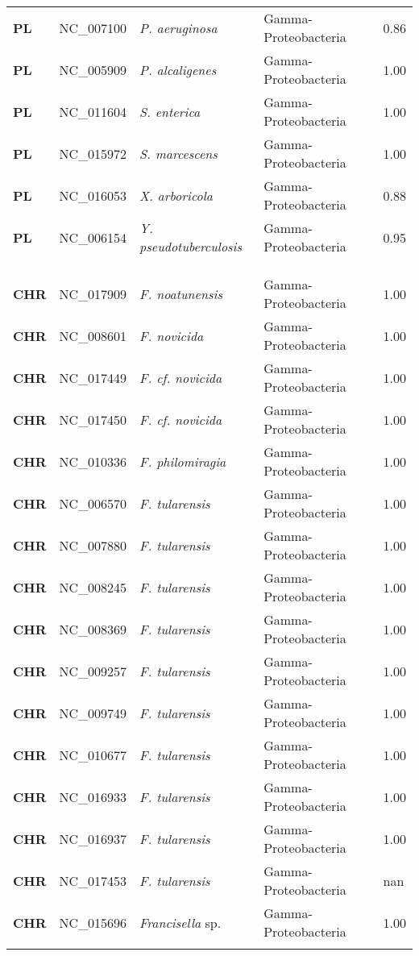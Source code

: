 \begin{adjustwidth}{-3cm}{2cm}
{\begin{supertabular}{>{\bfseries}l|p{0.1\textwidth}p{0.14\textwidth}l|l}
PL & NC\_007100 & \textit{P. aeruginosa} & Gamma-Proteobacteria & 0.86\\
PL & NC\_005909 & \textit{P. alcaligenes} & Gamma-Proteobacteria & 1.00\\
PL & NC\_011604 & \textit{S. enterica} & Gamma-Proteobacteria & 1.00\\
PL & NC\_015972 & \textit{S. marcescens} & Gamma-Proteobacteria & 1.00\\
PL & NC\_016053 & \textit{X. arboricola} & Gamma-Proteobacteria & 0.88\\
PL & NC\_006154 & \textit{Y. pseudotuberculosis} & Gamma-Proteobacteria & 0.95\\
\\
\\
\hline\\
CHR & NC\_017909 & \textit{F. noatunensis} & Gamma-Proteobacteria & 1.00\\
CHR & NC\_008601 & \textit{F. novicida} & Gamma-Proteobacteria & 1.00\\
CHR & NC\_017449 & \textit{F. cf. novicida} & Gamma-Proteobacteria & 1.00\\
CHR & NC\_017450 & \textit{F. cf. novicida} & Gamma-Proteobacteria & 1.00\\
CHR & NC\_010336 & \textit{F. philomiragia} & Gamma-Proteobacteria & 1.00\\
CHR & NC\_006570 & \textit{F. tularensis} & Gamma-Proteobacteria & 1.00\\
CHR & NC\_007880 & \textit{F. tularensis} & Gamma-Proteobacteria & 1.00\\
CHR & NC\_008245 & \textit{F. tularensis} & Gamma-Proteobacteria & 1.00\\
CHR & NC\_008369 & \textit{F. tularensis} & Gamma-Proteobacteria & 1.00\\
CHR & NC\_009257 & \textit{F. tularensis} & Gamma-Proteobacteria & 1.00\\
CHR & NC\_009749 & \textit{F. tularensis} & Gamma-Proteobacteria & 1.00\\
CHR & NC\_010677 & \textit{F. tularensis} & Gamma-Proteobacteria & 1.00\\
CHR & NC\_016933 & \textit{F. tularensis} & Gamma-Proteobacteria & 1.00\\
CHR & NC\_016937 & \textit{F. tularensis} & Gamma-Proteobacteria & 1.00\\
CHR & NC\_017453 & \textit{F. tularensis} & Gamma-Proteobacteria & nan\\
CHR & NC\_015696 & \textit{Francisella} sp. & Gamma-Proteobacteria & 1.00\\
\\


\end{supertabular}}
\end{adjustwidth}
